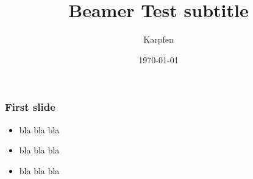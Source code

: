 \documentclass{beamer}
\title[Beamer Test]{Beamer Test subtitle}
\author{Karpfen}
\date{\today}
\begin{document}
\begin{frame}
\titlepage
\end{frame}

\begin{frame}
\frametitle{First slide}
\begin{itemize}
\item bla bla bla
\item bla bla bla
\item bla bla bla
\end{itemize}
\end{frame}
\end{document}
